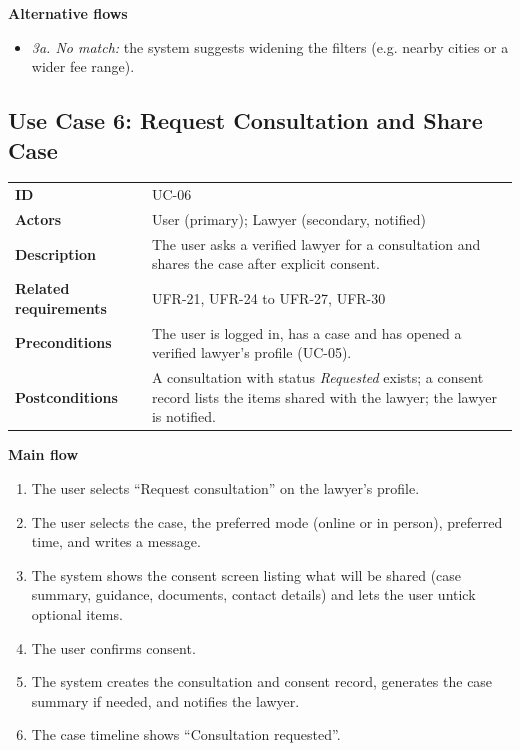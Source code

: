\textbf{Alternative flows}

\begin{itemize}
  \item \emph{3a. No match:} the system suggests widening the filters (e.g. nearby cities or a wider fee range).
\end{itemize}

\subsection{Use Case 6: Request Consultation and Share Case}

\begin{center}
\begin{tabular}{|L{2.81cm}|L{12.12cm}|}
\hline\headrow {} &  \\ \hline
\textbf{ID} & UC-06 \\ \hline
\textbf{Actors} & User (primary); Lawyer (secondary, notified) \\ \hline
\textbf{Description} & The user asks a verified lawyer for a consultation and shares the case after explicit consent. \\ \hline
\textbf{Related requirements} & UFR-21, UFR-24 to UFR-27, UFR-30 \\ \hline
\textbf{Preconditions} & The user is logged in, has a case and has opened a verified lawyer's profile (UC-05). \\ \hline
\textbf{Postconditions} & A consultation with status \emph{Requested} exists; a consent record lists the items shared with the lawyer; the lawyer is notified. \\ \hline
\end{tabular}
\end{center}

\textbf{Main flow}

\begin{enumerate}
  \item The user selects ``Request consultation'' on the lawyer's profile.
  \item The user selects the case, the preferred mode (online or in person), preferred time, and writes a message.
  \item The system shows the consent screen listing what will be shared (case summary, guidance, documents, contact details) and lets the user untick optional items.
  \item The user confirms consent.
  \item The system creates the consultation and consent record, generates the case summary if needed, and notifies the lawyer.
  \item The case timeline shows ``Consultation requested''.
\end{enumerate}

